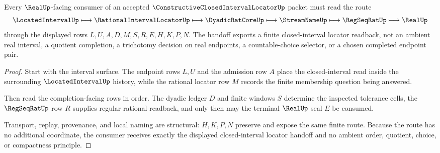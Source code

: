\begin{theorem}
\label{thm:constructive-closed-interval-locator-real-completion-handoff}
Every $\RealUp$-facing consumer of an accepted $\ConstructiveClosedIntervalLocatorUp$ packet must read the route
$$
\LocatedIntervalUp \longmapsto \RationalIntervalLocatorUp \longmapsto \DyadicRatCoreUp \longmapsto \StreamNameUp \longmapsto \RegSeqRatUp \longmapsto \RealUp
$$
through the displayed rows $L,U,A,D,M,S,R,E,H,K,P,N$. The handoff exports a finite closed-interval locator readback, not an ambient real interval, a quotient completion, a trichotomy decision on real endpoints, a countable-choice selector, or a chosen completed endpoint pair.
\end{theorem}
\begin{proof}
Start with the interval surface. The endpoint rows $L,U$ and the admission row $A$ place the closed-interval read inside the surrounding $\LocatedIntervalUp$ history, while the rational locator row $M$ records the finite membership question being answered.

Then read the completion-facing rows in order. The dyadic ledger $D$ and finite windows $S$ determine the inspected tolerance cells, the $\RegSeqRatUp$ row $R$ supplies regular rational readback, and only then may the terminal $\RealUp$ seal $E$ be consumed.

Transport, replay, provenance, and local naming are structural: $H,K,P,N$ preserve and expose the same finite route. Because the route has no additional coordinate, the consumer receives exactly the displayed closed-interval locator handoff and no ambient order, quotient, choice, or compactness principle.
\end{proof}

\begin{closurestatus}{\ConstructiveClosedIntervalLocatorUp}
  \theoryclosure{\seedClosure}
  \formalstatus{\unformalizedV}
\end{closurestatus}
